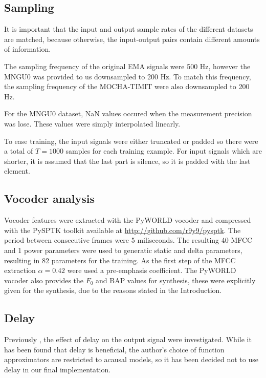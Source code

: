 \documentclass[a4paper]{article}
\begin{document}
\subsection{Sampling}

It is important that the input and output sample rates of the different
datasets are matched, because otherwise, the input-output pairs contain
different amounts of information.  

The sampling frequency of the original EMA signals were 500 Hz, however
the MNGU0 was provided to us downsampled to 200 Hz. To match this frequency,
the sampling frequency of the MOCHA-TIMIT were also downsampled to 200 Hz.

For the MNGU0 dataset, NaN values occured when the measurement precision
was lose. These values were simply interpolated linearly.

To ease training, the input signals were either truncated or padded
so there were a total of \( T = 1000 \) samples for each training example.
For input signals which are shorter, it is assumed that the last part is
silence, so it is padded with the last element.

\subsection{Vocoder analysis}

Vocoder features were extracted with the PyWORLD vocoder \cite{Morise2016}
and compressed with the PySPTK toolkit available at \url{http://github.com/r9y9/pysptk}.
The period between consecutive frames were 5 miliseconds. The resulting 40 MFCC
and 1 power parameters were used to generatic static and delta parameters,
resulting in 82 parameters for the training. As the first step of the MFCC extraction \( \alpha
= 0.42 \) were used a pre-emphasis coefficient. The PyWORLD vocoder
also provides the $ F_0 $ and BAP values for synthesis, these were
explicitly given for the synthesis, due to the reasons stated in the
Introduction.

\subsection{Delay}
Previously \cite{Gonzalez2016}, the effect of delay on the
output signal were investigated. While it has been found that delay
is beneficial, the author's choice of function approximators are
restricted to acausal models, so it has been decided
not to use delay in our final implementation.
\end{document}
